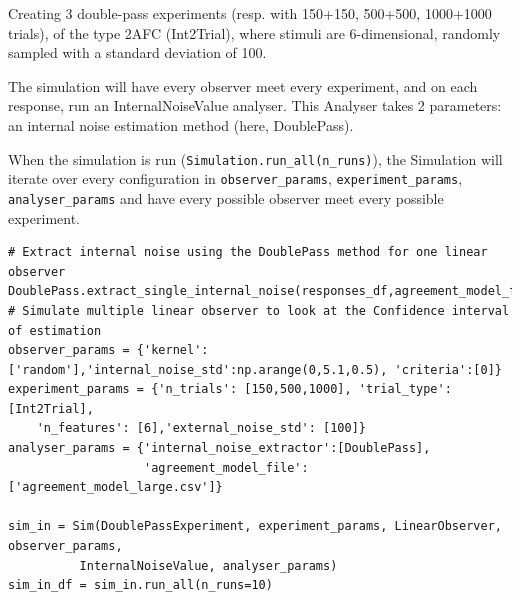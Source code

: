 \begin{tcolorbox}[title=Palin Toolbox: Internal Noise estimation,
    colback=white!30!white, colframe=blue!80!white]
Creating 3 double-pass experiments (resp. with 150+150, 500+500, 1000+1000 trials), of the type 2AFC (Int2Trial), where stimuli are 6-dimensional, randomly sampled with a standard deviation of 100.

The simulation will have every observer meet every experiment, and on each response, run an InternalNoiseValue analyser. This Analyser takes 2 parameters: an internal noise estimation method (here, DoublePass).  

When the simulation is run (\texttt{Simulation.run\_all(n\_runs)}), the Simulation will iterate over every configuration in \texttt{observer\_params}, \texttt{experiment\_params}, \texttt{analyser\_params} and have every possible observer meet every possible experiment.

\tcblower

\begin{verbatim}
# Extract internal noise using the DoublePass method for one linear observer
DoublePass.extract_single_internal_noise(responses_df,agreement_model_file='agreement_model_large.csv')
# Simulate multiple linear observer to look at the Confidence interval of estimation
observer_params = {'kernel':['random'],'internal_noise_std':np.arange(0,5.1,0.5), 'criteria':[0]}
experiment_params = {'n_trials': [150,500,1000], 'trial_type': [Int2Trial], 
    'n_features': [6],'external_noise_std': [100]}
analyser_params = {'internal_noise_extractor':[DoublePass],
                   'agreement_model_file':['agreement_model_large.csv']}         
                   
sim_in = Sim(DoublePassExperiment, experiment_params, LinearObserver, observer_params, 
          InternalNoiseValue, analyser_params)
sim_in_df = sim_in.run_all(n_runs=10)
\end{verbatim}

\end{tcolorbox}
